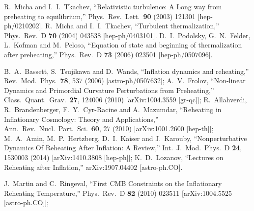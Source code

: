 \documentclass[%
aps,prd,nofootinbib,showkeys,a4paper,10pt
]{revtex4-2}
\begin{document}
\begin{thebibliography}{10}
R.~Micha and I.~I.~Tkachev,
``Relativistic turbulence: A Long way from preheating to equilibrium,''
Phys.\ Rev.\ Lett.\  {\bf 90} (2003) 121301
[hep-ph/0210202].
R.~Micha and I.~I.~Tkachev,
``Turbulent thermalization,''
Phys.\ Rev.\ D {\bf 70} (2004) 043538
[hep-ph/0403101].
D.~I.~Podolsky, G.~N.~Felder, L.~Kofman and M.~Peloso,
``Equation of state and beginning of thermalization after preheating,''
Phys.\ Rev.\ D {\bf 73} (2006) 023501
[hep-ph/0507096].



B.~A.~Bassett, S.~Tsujikawa and D.~Wands,
``Inflation dynamics and reheating,''
Rev.\ Mod.\ Phys.\  {\bf 78}, 537 (2006)
[astro-ph/0507632];
A.~V.~Frolov,
``Non-linear Dynamics and Primordial Curvature Perturbations from Preheating,''
Class.\ Quant.\ Grav.\  {\bf 27}, 124006 (2010)
[arXiv:1004.3559 [gr-qc]];
R.~Allahverdi, R.~Brandenberger, F.~Y.~Cyr-Racine and A.~Mazumdar,
``Reheating in Inflationary Cosmology: Theory and Applications,''
Ann.\ Rev.\ Nucl.\ Part.\ Sci.\  {\bf 60}, 27 (2010)
[arXiv:1001.2600 [hep-th]];
M.~A.~Amin, M.~P.~Hertzberg, D.~I.~Kaiser and J.~Karouby,
``Nonperturbative Dynamics Of Reheating After Inflation: A Review,''
Int.\ J.\ Mod.\ Phys.\ D {\bf 24}, 1530003 (2014)
[arXiv:1410.3808 [hep-ph]];
K.~D.~Lozanov,
``Lectures on Reheating after Inflation,''
arXiv:1907.04402 [astro-ph.CO].



J.~Martin and C.~Ringeval,
``First CMB Constraints on the Inflationary Reheating Temperature,''
Phys.\ Rev.\ D {\bf 82} (2010) 023511
[arXiv:1004.5525 [astro-ph.CO]];


\end{thebibliography}
\end{document}
